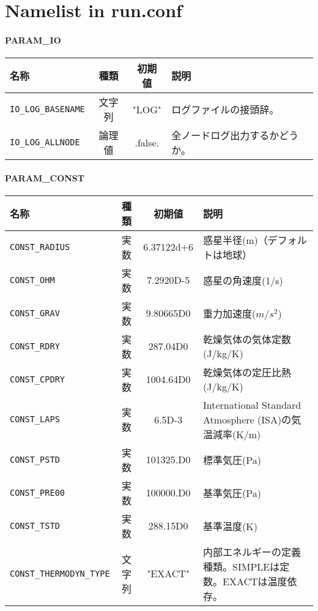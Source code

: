 \chapter{Namelist in run.conf} \label{app:namelist}

\subsubsection{PARAM\_IO}
\begin{tabularx}{150mm}{|l|c|c|X|} \hline
 \rowcolor[gray]{0.9} 名称 & 種類 & 初期値 & 説明 \\ \hline
 \verb|IO_LOG_BASENAME| & 文字列 & "LOG" & ログファイルの接頭辞。 \\ \hline
 \verb|IO_LOG_ALLNODE| & 論理値 & .false. & 全ノードログ出力するかどうか。 \\ \hline
\end{tabularx}


\subsubsection{PARAM\_CONST}
\begin{tabularx}{150mm}{|l|c|c|X|} \hline
 \rowcolor[gray]{0.9} 名称 & 種類 & 初期値 & 説明 \\ \hline
 \verb|CONST_RADIUS| & 実数 & 6.37122d+6 & 惑星半径(m)（デフォルトは地球） \\ \hline
 \verb|CONST_OHM| & 実数 & 7.2920D-5 & 惑星の角速度(1/s) \\ \hline
 \verb|CONST_GRAV| & 実数 & 9.80665D0 & 重力加速度($m/s^{2}$) \\ \hline
 \verb|CONST_RDRY| & 実数 & 287.04D0 & 乾燥気体の気体定数 (J/kg/K)\\ \hline
 \verb|CONST_CPDRY| & 実数 & 1004.64D0 & 乾燥気体の定圧比熱 (J/kg/K) \\ \hline
 \verb|CONST_LAPS| & 実数 & 6.5D-3 & International Standard Atmosphere (ISA)の気温減率(K/m) \\ \hline
 \verb|CONST_PSTD| & 実数 & 101325.D0 & 標準気圧(Pa) \\ \hline
 \verb|CONST_PRE00| & 実数 & 100000.D0 & 基準気圧(Pa) \\ \hline
 \verb|CONST_TSTD| & 実数 & 288.15D0 & 基準温度(K) \\ \hline
 \verb|CONST_THERMODYN_TYPE| & 文字列 & "EXACT" & 内部エネルギーの定義種類。SIMPLEは定数。EXACTは温度依存。 \\ \hline
\end{tabularx}

